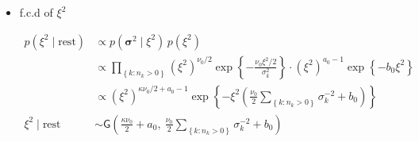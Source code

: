 \begin{appendix}
\begin{itemize}
\begin{equation}
\begin{split}
p(\bm{\beta} \mid \text{rest}) 
&\propto  p(\bm{\xi} \mid\bm{\beta},\bm{\Sigma}) p(\bm{\beta}) \\
&\propto \prod_{\left\lbrace k : n_k > 0\right\rbrace} 
\exp\left\{ -\frac{1}{2} (\bm{\beta}_k - \bm{\beta})^\top \bm{\Sigma}^{-1} (\bm{\beta}_k - \bm{\beta}) \right\}
\times 
\exp\left\{ -\frac{1}{2} (\bm{\beta} - \bm{\mu}_0)^\top \bm{\Lambda}_0^{-1} (\bm{\beta} - \bm{\mu}_0) \right\} \\
&\propto \exp\left\{ -\frac{1}{2} \sum_{\left\lbrace k : n_k > 0\right\rbrace}
(\bm{\beta}_k - \bm{\beta})^\top \bm{\Sigma}^{-1} (\bm{\beta}_k - \bm{\beta}) \right\}
\times 
\exp\left\{ -\frac{1}{2} (\bm{\beta} - \bm{\mu}_0)^\top \bm{\Lambda}_0^{-1} (\bm{\beta} - \bm{\mu}_0) \right\} \\
&\propto \exp\left\{ 
-\frac{1}{2} \left[
\kappa \bm{\beta}^\top \bm{\Sigma}^{-1} \bm{\beta}
- 2 \bm{\beta}^\top \bm{\Sigma}^{-1} \sum_{\left\lbrace k : n_k > 0\right\rbrace} \bm{\beta}_k
\right]
\right\} \\
&\quad \times 
\exp\left\{ 
-\frac{1}{2} \left[
\bm{\beta}^\top \bm{\Lambda}_0^{-1} \bm{\beta}
- 2 \bm{\beta}^\top \bm{\Lambda}_0^{-1} \bm{\mu}_0
\right]
\right\} \\
&\propto \exp\left\{ 
-\frac{1}{2} \left[\bm{\beta}^\top 
\left( \kappa \bm{\Sigma}^{-1} + \bm{\Lambda}_0^{-1} \right) \bm{\beta} 
+ \bm{\beta}^\top 
\left( \bm{\Lambda}_0^{-1} \bm{\mu}_0 + \bm{\Sigma}^{-1} \sum_{\left\lbrace k : n_k > 0\right\rbrace} \bm{\beta}_k \right)\right]
\right\}\\
\bm{\beta} \mid \text{rest} \sim & \mathsf{N_p}\left(\left( \kappa \bm{\Sigma}^{-1} + \bm{\Lambda}_0^{-1} \right)^{-1}\left( \bm{\Lambda}_0^{-1} \bm{\mu}_0 + \bm{\Sigma}^{-1} \sum_{\left\lbrace k : n_k > 0\right\rbrace} \bm{\beta}_k \right), \left( \kappa \bm{\Sigma}^{-1} + \bm{\Lambda}_0^{-1} \right)^{-1}\right)
\end{split}
\end{equation}

\item f.c.d of $\xi^2$

\begin{equation}
\begin{split}
p(\xi^2 \mid \text{rest}) 
&\propto p(\bm{\sigma}^2 \mid \xi^2) 
\, p(\xi^2) \\
&\propto \prod_{\left\lbrace k : n_k > 0\right\rbrace} (\xi^2)^{\nu_0 / 2} 
\exp\left\{ -\frac{\nu_0 \xi^2 / 2}{\sigma_k^2} \right\}
\cdot (\xi^2)^{a_0 - 1} 
\exp\left\{ -b_0 \xi^2 \right\} \\[6pt]
&\propto (\xi^2)^{\kappa \nu_0 / 2 + a_0 - 1} 
\exp\left\{ -\xi^2 \left( \frac{\nu_0}{2} \sum_{\left\lbrace k : n_k > 0\right\rbrace} \sigma_k^{-2} + b_0 \right) \right\}\\
\xi^2 \mid \text{rest} &\sim \mathsf{G} \left(
\frac{\kappa \nu_0}{2} + a_0,\ 
\frac{\nu_0}{2} \sum_{\left\lbrace k : n_k > 0\right\rbrace} \sigma_k^{-2} + b_0
\right)
\end{split}
\end{equation}


\end{itemize}
\end{appendix}
